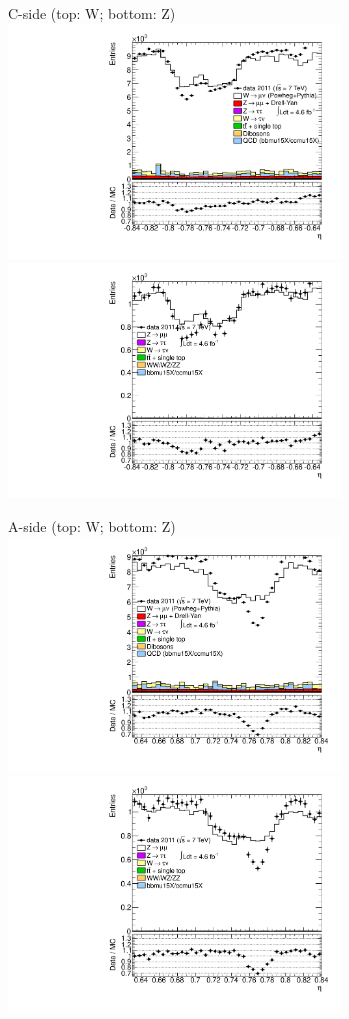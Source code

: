 {

\colb[T]

C-side (top: W; bottom: Z)
\centering
\includegraphics[width=0.66\textwidth]{dates/20130306/figures/etaphi/W_4_C_stack_l_eta_POS} \\
\includegraphics[width=0.66\textwidth]{dates/20130306/figures/etaphi/Z_4_C_stack_lP_eta_ALL.pdf}

A-side (top: W; bottom: Z)
\centering
\includegraphics[width=0.66\textwidth]{dates/20130306/figures/etaphi/W_4_A_stack_l_eta_POS} \\
\includegraphics[width=0.66\textwidth]{dates/20130306/figures/etaphi/Z_4_A_stack_lP_eta_ALL.pdf} 

\cole
}


